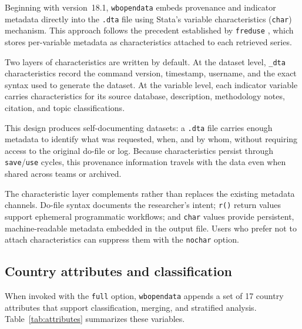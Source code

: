 \documentclass[bib]{statapress}
\begin{document}
Beginning with version~18.1, \texttt{wbopendata} embeds provenance and
indicator metadata directly into the \texttt{.dta} file using Stata's variable
characteristics (\texttt{char}) mechanism. This approach follows the precedent
established by \texttt{freduse} \citep{drukker2006freduse}, which stores
per-variable metadata as characteristics attached to each retrieved series.

Two layers of characteristics are written by default. At the dataset level,
\texttt{\_dta} characteristics record the command version, timestamp, username,
and the exact syntax used to generate the dataset. At the variable level, each
indicator variable carries characteristics for its source database, description,
methodology notes, citation, and topic classifications.

This design produces self-documenting datasets: a \texttt{.dta} file carries
enough metadata to identify what was requested, when, and by whom, without
requiring access to the original do-file or log. Because characteristics
persist through \texttt{save}/\texttt{use} cycles, this provenance information
travels with the data even when shared across teams or archived.

The characteristic layer complements rather than replaces the existing metadata
channels. Do-file syntax documents the researcher's intent; \texttt{r()} return
values support ephemeral programmatic workflows; and \texttt{char} values
provide persistent, machine-readable metadata embedded in the output file.
Users who prefer not to attach characteristics can suppress them with the
\texttt{nochar} option.

\subsection{Country attributes and classification}

When invoked with the \texttt{full} option, \texttt{wbopendata} appends a set of
17 country attributes that support classification, merging, and stratified
analysis. Table~\ref{tab:attributes} summarizes these variables.
\end{document}
